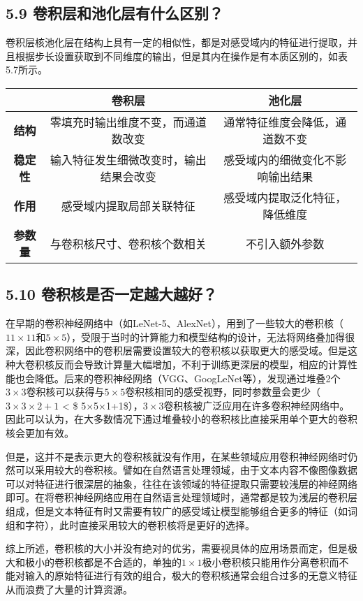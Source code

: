\subsection{5.9
卷积层和池化层有什么区别？}\label{ux5377ux79efux5c42ux548cux6c60ux5316ux5c42ux6709ux4ec0ux4e48ux533aux522b}

​
卷积层核池化层在结构上具有一定的相似性，都是对感受域内的特征进行提取，并且根据步长设置获取到不同维度的输出，但是其内在操作是有本质区别的，如表5.7所示。

\begin{longtable}[]{ ccc }
\toprule
& 卷积层 & 池化层\tabularnewline
\midrule
\endhead
\textbf{结构} & 零填充时输出维度不变，而通道数改变 &
通常特征维度会降低，通道数不变\tabularnewline
\textbf{稳定性} & 输入特征发生细微改变时，输出结果会改变 &
感受域内的细微变化不影响输出结果\tabularnewline
\textbf{作用} & 感受域内提取局部关联特征 &
感受域内提取泛化特征，降低维度\tabularnewline
\textbf{参数量} & 与卷积核尺寸、卷积核个数相关 &
不引入额外参数\tabularnewline
\bottomrule
\end{longtable}

\subsection{5.10
卷积核是否一定越大越好？}\label{ux5377ux79efux6838ux662fux5426ux4e00ux5b9aux8d8aux5927ux8d8aux597d}

​
在早期的卷积神经网络中（如LeNet-5、AlexNet），用到了一些较大的卷积核（\(11\times11\)和\(5\times 5\)），受限于当时的计算能力和模型结构的设计，无法将网络叠加得很深，因此卷积网络中的卷积层需要设置较大的卷积核以获取更大的感受域。但是这种大卷积核反而会导致计算量大幅增加，不利于训练更深层的模型，相应的计算性能也会降低。后来的卷积神经网络（VGG、GoogLeNet等），发现通过堆叠2个\(3\times 3\)卷积核可以获得与\(5\times 5\)卷积核相同的感受视野，同时参数量会更少（\(3×3×2+1\)
\textless{} \$
5×5×1+1\$），\(3\times 3\)卷积核被广泛应用在许多卷积神经网络中。因此可以认为，在大多数情况下通过堆叠较小的卷积核比直接采用单个更大的卷积核会更加有效。

​
但是，这并不是表示更大的卷积核就没有作用，在某些领域应用卷积神经网络时仍然可以采用较大的卷积核。譬如在自然语言处理领域，由于文本内容不像图像数据可以对特征进行很深层的抽象，往往在该领域的特征提取只需要较浅层的神经网络即可。在将卷积神经网络应用在自然语言处理领域时，通常都是较为浅层的卷积层组成，但是文本特征有时又需要有较广的感受域让模型能够组合更多的特征（如词组和字符），此时直接采用较大的卷积核将是更好的选择。

​
综上所述，卷积核的大小并没有绝对的优劣，需要视具体的应用场景而定，但是极大和极小的卷积核都是不合适的，单独的\(1\times 1\)极小卷积核只能用作分离卷积而不能对输入的原始特征进行有效的组合，极大的卷积核通常会组合过多的无意义特征从而浪费了大量的计算资源。

